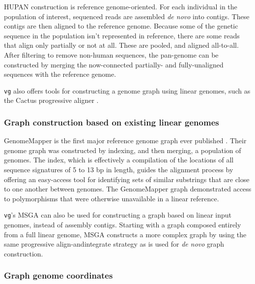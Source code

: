 HUPAN construction is reference genome-oriented.
For each individual in the population of interest, sequenced reads are assembled \textit{de novo} into contigs.
These contigs are then aligned to the reference genome.
Because some of the genetic sequence in the population isn't represented in reference, there are some reads that align only partially or not at all.
These are pooled, and aligned all-to-all.
After filtering to remove non-human sequences, the pan-genome can be constructed by merging the now-connected partially- and fully-unaligned sequences with the reference genome.

\texttt{vg} also offers tools for constructing a genome graph using linear genomes, such as the Cactus progressive aligner \cite{Garrison_2018}.


\subsubsection{Graph construction based on existing linear genomes}

GenomeMapper is the first major reference genome graph ever published \cite{Schneeberger_2009}.
Their genome graph was constructed by indexing, and then merging, a population of genomes. 
The index, which is effectively a compilation of the locations of all sequence signatures of 5 to 13 bp in length, guides the alignment process by offering an easy-access tool for identifying sets of similar substrings that are close to one another between genomes. 
The GenomeMapper graph demonstrated access to polymorphisms that were otherwise unavailable in a linear reference.

\texttt{vg}'s MSGA can also be used for constructing a graph based on linear input genomes, instead of assembly contigs.
Starting with a graph composed entirely from a full linear genome, MSGA constructs a more complex graph by using the same progressive align-andintegrate strategy as is used for \textit{de novo} graph construction. 

\subsubsection{Graph genome coordinates}

